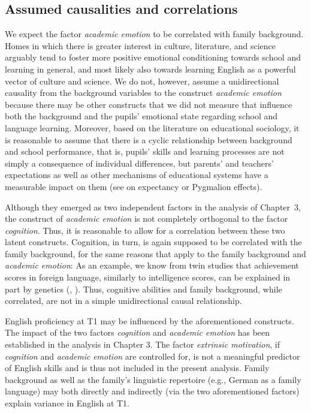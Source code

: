 \documentclass[output=paper]{langsci/langscibook}
\begin{document}
\subsection{Assumed causalities and correlations}

We expect the factor \textit{academic emotion} to be correlated with family background. Homes in which there is greater interest in culture, literature, and science arguably tend to foster more positive emotional conditioning towards school and learning in general, and most likely also towards learning English as a powerful vector of culture and science. We do not, however, assume a unidirectional causality from the background variables to the construct \textit{academic emotion} because there may be other constructs that we did not measure that influence both the background and the pupils’ emotional state regarding school and language learning. Moreover, based on the literature on educational sociology, it is reasonable to assume that there is a cyclic relationship between background and school performance, that is, pupils’ skills and learning processes are not simply a consequence of individual differences, but parents’ and teachers’ expectations as well as other mechanisms of educational systems have a measurable impact on them (see \citealt{JussimHarber2005} on expectancy or Pygmalion effects).

Although they emerged as two independent factors in the analysis of Chapter~3, the construct of \textit{academic emotion} is not completely orthogonal to the factor \textit{cognition}. Thus, it is reasonable to allow for a correlation between these two latent constructs. Cognition, in turn, is again supposed to be correlated with the family background, for the same reasons that apply to the family background and \textit{academic emotion}: As an example, we know from twin studies that achievement scores in foreign language, similarly to intelligence scores, can be explained in part by genetics (\citealt{RimfeldEtAl2015}, \citealt{Stromswold2001}). Thus, cognitive abilities and family background, while correlated, are not in a simple unidirectional causal relationship. 

English proficiency at T1 may be influenced by the aforementioned constructs. The impact of the two factors \textit{cognition} and \textit{academic emotion} has been established in the analysis in Chapter 3. The factor \textit{extrinsic motivation}, if \textit{cognition} and \textit{academic} \textit{emotion} are controlled for, is not a meaningful predictor of English skills and is thus not included in the present analysis. Family background as well as the family’s linguistic repertoire (e.g., German as a family language) may both directly and indirectly (via the two aforementioned factors) explain variance in English at T1. 
\end{document}
